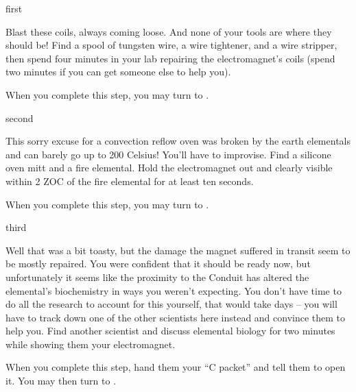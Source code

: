 \documentclass[notebook]{elementals}
\begin{document}

\startnotebook{\nEnslavementResearch{}}

\begin{page}{first}

Blast these coils, always coming loose. And none of your tools are where they should be! Find a spool of tungsten wire, a wire tightener, and a wire stripper, then spend four minutes in your lab repairing the electromagnet's coils (spend two minutes if you can get someone else to help you).

When you complete this step, you may turn to .

\end{page}

\begin{page}{second}

This sorry excuse for a convection reflow oven was broken by the earth elementals and can barely go up to 200 Celsius! You'll have to improvise. Find a silicone oven mitt and a fire elemental. Hold the electromagnet out and clearly visible within 2 ZOC of the fire elemental for at least ten seconds.

When you complete this step, you may turn to .

\end{page}

\begin{page}{third}

Well that was a bit toasty, but the damage the magnet suffered in transit seem to be mostly repaired. You were confident that it should be ready now, but unfortunately it seems like the proximity to the Conduit has altered the elemental's biochemistry in ways you weren't expecting. You don't have time to do all the research to account for this yourself, that would take days -- you will have to track down one of the other scientists here instead and convince them to help you. Find another scientist and discuss elemental biology for two minutes while showing them your electromagnet.

When you complete this step, hand them your ``C packet'' and tell them to open it. You may then turn to .

\end{page}
\end{document}
